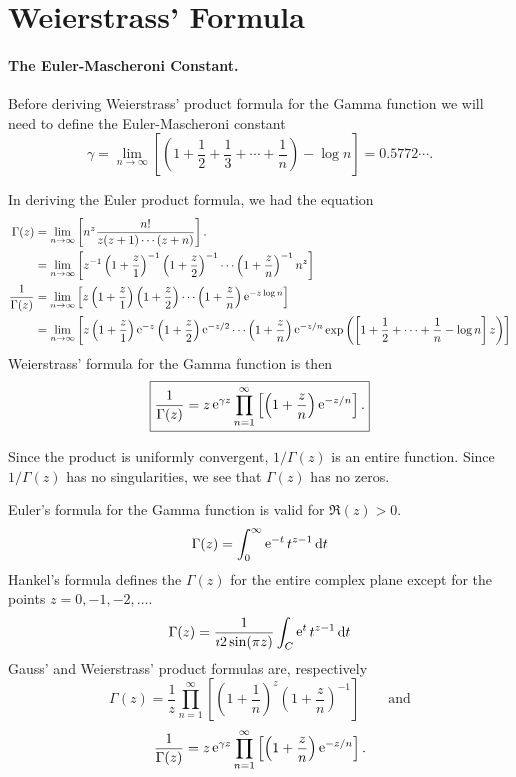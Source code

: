 \section{Weierstrass' Formula}

\paragraph{The Euler-Mascheroni Constant.}
Before deriving Weierstrass' product formula for the Gamma function we will
need to define the Euler-Mascheroni constant
\[ \gamma = \lim_{n \to \infty} \left[ \left(1 + \frac{1}{2} + \frac{1}{3} +
    \cdots + \frac{1}{n} \right) - \log n \right] = 0.5772\cdots. \]

In deriving the Euler product formula, we had the equation
\begin{align*}
  \Gamma(z)
  &= \lim_{n \to \infty}\left[ n^z \frac{n!}{z(z+1)\cdots(z+n)}\right]. \\
  &= \lim_{n \to \infty} \left[z^{-1} \left(1 + \frac{z}{1}\right)^{-1} 
    \left(1 + \frac{z}{2}\right)^{-1} \cdots 
    \left(1 + \frac{z}{n}\right)^{-1} n^z \right] \\
  \frac{1}{\Gamma(z)}
  &= \lim_{n \to \infty} \left[ z \left(1 + \frac{z}{1}\right)
    \left(1 + \frac{z}{2}\right)
    \cdots \left(1 + \frac{z}{n}\right) \mathop{\mathrm{e}}\nolimits^{-z \log n} \right]  \\
  &= \lim_{n \to \infty} \left[ z \left(1 + \frac{z}{1}\right) \mathop{\mathrm{e}}\nolimits^{-z} 
    \left(1 + \frac{z}{2}\right) \mathop{\mathrm{e}}\nolimits^{-z/2} \cdots 
    \left(1 + \frac{z}{n}\right) \mathop{\mathrm{e}}\nolimits^{-z/n} 
    \exp\left(\left[1 + \frac{1}{2} + \cdots + 
        \frac{1}{n} - \log n \right] z \right) \right] 
\end{align*}
Weierstrass' formula for the Gamma function is then
\[ \boxed{ \frac{1}{\Gamma(z)} = z \mathop{\mathrm{e}}\nolimits^{\gamma z} \prod_{n=1}^\infty 
  \left[ \left(1+\frac{z}{n}\right) \mathop{\mathrm{e}}\nolimits^{-z/n} \right]. } \]

Since the product is uniformly convergent, $1/\Gamma(z)$ is an entire function.
Since $1/\Gamma(z)$ has no singularities, we see that $\Gamma(z)$ has no 
zeros.  







\begin{Result}
  Euler's formula for the Gamma function is valid for $\Re(z) > 0$.
  \[ \Gamma(z) = \int_0^\infty \mathop{\mathrm{e}}\nolimits^{-t} t^{z-1}\,\mathrm{d} t \]
  Hankel's formula defines the $\Gamma(z)$ for the entire complex plane except
  for the points $z = 0, -1, -2, \ldots$.
  \[ \Gamma(z) = \frac{1}{\imath 2 \sin(\pi z)} \int_C \mathop{\mathrm{e}}\nolimits^t t^{z-1}\,\mathrm{d} t \]
  Gauss' and Weierstrass' product formulas are, respectively
  \[ \Gamma(z) = \frac{1}{z} \prod_{n=1}^\infty \left[ \left(1 + \frac{1}{n}
    \right)^z \left(1 + \frac{z}{n} \right)^{-1} \right]
  \qquad \mathrm{and} \]
  \[ \frac{1}{\Gamma(z)} = z \mathop{\mathrm{e}}\nolimits^{\gamma z} \prod_{n=1}^\infty \left[ \left(
      1 + \frac{z}{n} \right) \mathop{\mathrm{e}}\nolimits^{-z/n} \right]. \]
\end{Result}




